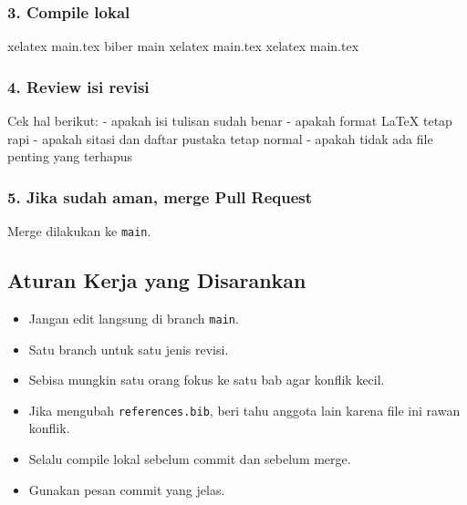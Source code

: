 \documentclass[
]{article}
\newenvironment{Shaded}{}{}
\newcommand{\ExtensionTok}[1]{#1}
\newcommand{\NormalTok}[1]{#1}
\providecommand{\tightlist}{%
  \setlength{\itemsep}{0pt}\setlength{\parskip}{0pt}}
\begin{document}
\subsubsection{3. Compile lokal}\label{compile-lokal}

\begin{Shaded}
\begin{Highlighting}[]
\ExtensionTok{xelatex}\NormalTok{ main.tex}
\ExtensionTok{biber}\NormalTok{ main}
\ExtensionTok{xelatex}\NormalTok{ main.tex}
\ExtensionTok{xelatex}\NormalTok{ main.tex}
\end{Highlighting}
\end{Shaded}

\subsubsection{4. Review isi revisi}\label{review-isi-revisi}

Cek hal berikut: - apakah isi tulisan sudah benar - apakah format LaTeX
tetap rapi - apakah sitasi dan daftar pustaka tetap normal - apakah
tidak ada file penting yang terhapus

\subsubsection{5. Jika sudah aman, merge Pull
Request}\label{jika-sudah-aman-merge-pull-request}

Merge dilakukan ke \texttt{main}.

\subsection{Aturan Kerja yang
Disarankan}\label{aturan-kerja-yang-disarankan}

\begin{itemize}
\tightlist
\item
  Jangan edit langsung di branch \texttt{main}.
\item
  Satu branch untuk satu jenis revisi.
\item
  Sebisa mungkin satu orang fokus ke satu bab agar konflik kecil.
\item
  Jika mengubah \texttt{references.bib}, beri tahu anggota lain karena
  file ini rawan konflik.
\item
  Selalu compile lokal sebelum commit dan sebelum merge.
\item
  Gunakan pesan commit yang jelas.
\end{itemize}
\end{document}
